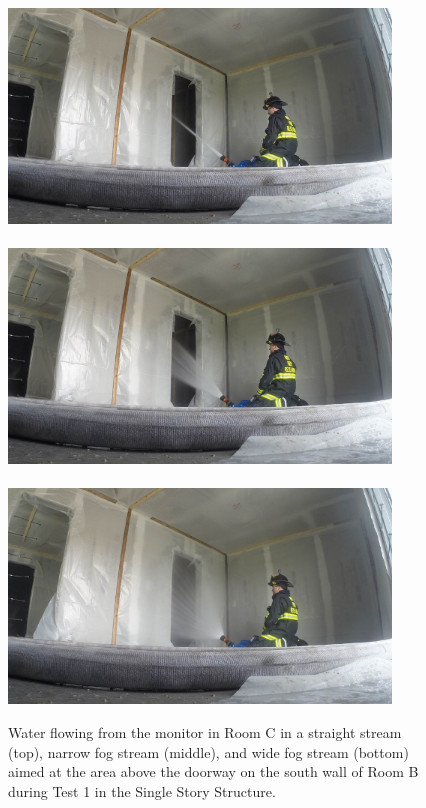 \documentclass[12pt,oneside]{book}
\begin{document}
\begin{figure}[!ht]
	\includegraphics[trim=16cm 6.25cm 9cm 6cm, clip=true, width=4in]{../Figures/Pictures/SS_Room_B_Test_33}
	\\~\\
	\includegraphics[trim=16cm 6.25cm 9cm 6cm, clip=true, width=4in]{../Figures/Pictures/NF_Room_B_Test_33}
	\\~\\
	\includegraphics[trim=16cm 6.25cm 9cm 6cm, clip=true, width=4in]{../Figures/Pictures/WF_Room_B_Test_33}
	\caption[Straight stream, narrow fog stream, and wide fog stream during Test 1.]{Water flowing from the monitor in Room C in a straight stream (top), narrow fog stream (middle), and wide fog stream (bottom) aimed at the area above the doorway on the south wall of Room B during Test 1 in the Single Story Structure.}
	\label{fig:test_1_pic}
\end{figure}
\end{document}
